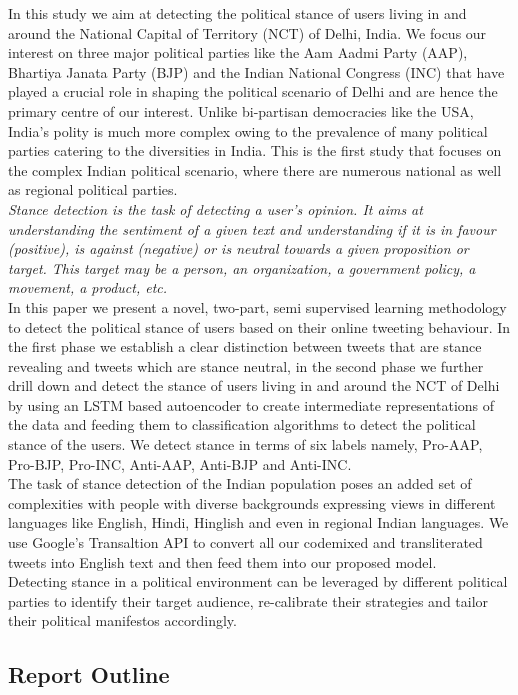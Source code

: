 \documentclass[a4paper,11pt]{article}
\begin{document}
In this study we aim at detecting the political stance of users living in and around the National Capital of Territory (NCT) of Delhi, India. We focus our interest on three major political parties like the Aam Aadmi Party (AAP), Bhartiya Janata Party (BJP) and the Indian National Congress (INC) that have played a crucial role in shaping the political scenario of Delhi and are hence the primary centre of our interest.
Unlike bi-partisan democracies like the USA, India's polity is much more complex owing to the prevalence of many political parties catering to the diversities in India. This is the first study that focuses on the complex Indian political scenario, where there are numerous national as well as regional political parties.\medskip\\
\textit{Stance detection is the task of detecting a user’s opinion. It aims at understanding the sentiment of a given text and understanding if it is in favour (positive), is against (negative) or is neutral towards a given proposition or target. This target may be a person, an organization, a government policy, a movement, a product, etc.}\medskip\\
In this paper we present a novel, two-part, semi supervised learning methodology to detect the political stance of users based on their online tweeting behaviour. In the first phase we establish a clear distinction between tweets that are stance revealing and tweets which are stance neutral, in the second phase we further drill down and detect the stance of users living in and around the NCT of Delhi by using an LSTM based autoencoder to create intermediate representations of the data and feeding them to classification algorithms to detect the political stance of the users. We detect stance in terms of six labels namely, Pro-AAP, Pro-BJP, Pro-INC, Anti-AAP, Anti-BJP and Anti-INC.\medskip\\
The task of stance detection of the Indian population poses an added set of complexities with people with diverse backgrounds expressing views in different languages like English, Hindi, Hinglish and even in regional Indian languages. We use Google's Transaltion API to convert all our codemixed and transliterated tweets into English text and then feed them into our proposed model.\medskip\\
Detecting stance in a political environment can be leveraged by different political parties to identify their target audience, re-calibrate their strategies and tailor their political manifestos accordingly.
\newpage
\subsection{Report Outline}
\end{document}
